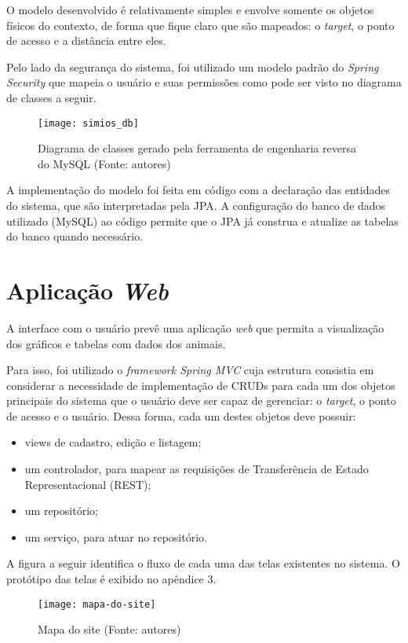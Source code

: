O modelo desenvolvido é relativamente simples e envolve somente os objetos físicos do contexto, de forma que fique claro que são mapeados: o \emph{target}, o ponto de acesso e a distância entre eles.

Pelo lado da segurança do sistema, foi utilizado um modelo padrão do \emph{Spring Security} que mapeia o usuário e suas permissões como pode ser visto no diagrama de classes a seguir.

\begin{figure}[ht]
  \centering
    \texttt{[image: simios\_db]}
  \caption{Diagrama de classes gerado pela ferramenta de engenharia reversa do MySQL (Fonte: autores)}
\end{figure}
\FloatBarrier

A implementação do modelo foi feita em código com a declaração das entidades do sistema, que são interpretadas pela JPA. A configuração do banco de dados utilizado (MySQL) ao código permite que o JPA já construa e atualize as tabelas do banco quando necessário.

\section{Aplicação \emph{Web}}

A interface com o usuário prevê uma aplicação \emph{web} que permita a visualização dos gráficos e tabelas com dados dos animais.

Para isso, foi utilizado o \emph{framework Spring MVC} cuja estrutura consistia em considerar a necessidade de implementação de CRUDs para cada um dos objetos principais do sistema que o usuário deve ser capaz de gerenciar: o \emph{target}, o ponto de acesso e o usuário. Dessa forma, cada um destes objetos deve possuir:

\begin{itemize}
	\item views de cadastro, edição e listagem;
	\item um controlador, para mapear as requisições de Transferência de Estado Representacional (REST);
	\item um repositório;
	\item um serviço, para atuar no repositório.
\end{itemize}

A figura a seguir identifica o fluxo de cada uma das telas existentes no sistema. O protótipo das telas é exibido no apêndice 3.

\begin{figure}[ht]
  \centering
    \texttt{[image: mapa-do-site]}
  \caption{Mapa do site (Fonte: autores)}
\end{figure}
\FloatBarrier
